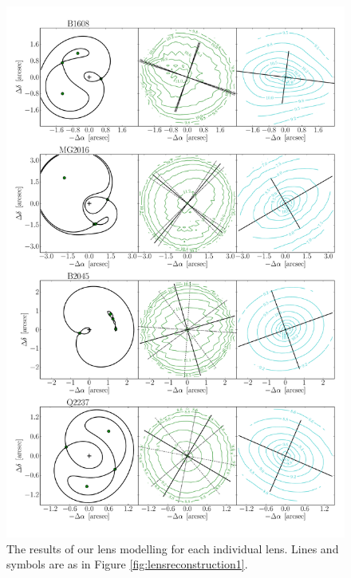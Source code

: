 \documentclass[useAMS,usenatbib]{mn2e}
\begin{document}
\begin{figure}
  \centering
  \includegraphics[width=.8\linewidth]{Figures/AllLenses33.pdf}
  \caption[width=.65\linewidth]{The results of our lens modelling for each individual lens. Lines and symbols are as in Figure \ref{fig:lensreconstruction1}.}
  \label{fig:lensreconstruction3}
\end{figure}
\end{document}

